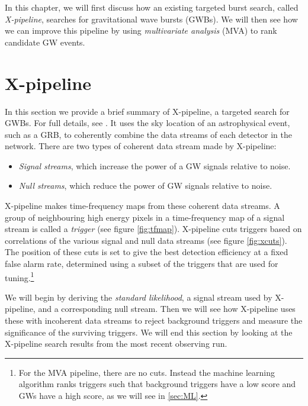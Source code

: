 \documentclass[11pt]{cuthesis}
\newcommand{\xp}{X-pipeline }
\newcommand{\xpc}{X-pipeline, }
\begin{document}
In this chapter, we will first discuss how an existing targeted burst search, called \textit{X-pipeline}, searches for gravitational wave bursts (GWBs). We will then see how we can improve this pipeline by using \textit{multivariate analysis} (MVA) to rank candidate GW events.  

\section{X-pipeline} \label{xtriggers}
In this section we provide a brief summary of \xpc a targeted search for GWBs. For full details, see \cite{xpipeline,was_xpipeline}. It uses the sky location of an astrophysical event, such as a GRB, to coherently combine the data streams of each detector in the network. There are two types of coherent data stream made by X-pipeline:
\begin{itemize}
\item \textit{Signal streams}, which increase the power of a GW signals relative to noise.
\item \textit{Null streams}, which reduce the power of GW signals relative to noise.
\end{itemize}
\xp makes time-frequency maps from these coherent data streams. A group of neighbouring high energy pixels in a time-frequency map of a signal stream is called a  \textit{trigger} (see figure \ref{fig:tfmap}). \xp cuts triggers based on correlations of the various signal and null data streams (see figure \ref{fig:xcuts}). The position of these cuts is set to give the best detection efficiency at a fixed false alarm rate, determined using a subset of the triggers that are used for tuning.\footnote{For the MVA pipeline, there are no cuts. Instead the machine learning algorithm ranks triggers such that background triggers have a low score and GWs have a high score, as we will see in \ref{sec:ML}.}

We will begin by deriving the \textit{standard likelihood}, a signal stream used by X-pipeline, and a corresponding null stream. Then we will see how \xp uses these with incoherent data streams to reject background triggers and measure the significance of the surviving triggers. We will end this section by looking at the \xp search results from the most recent observing run.  
\end{document}
